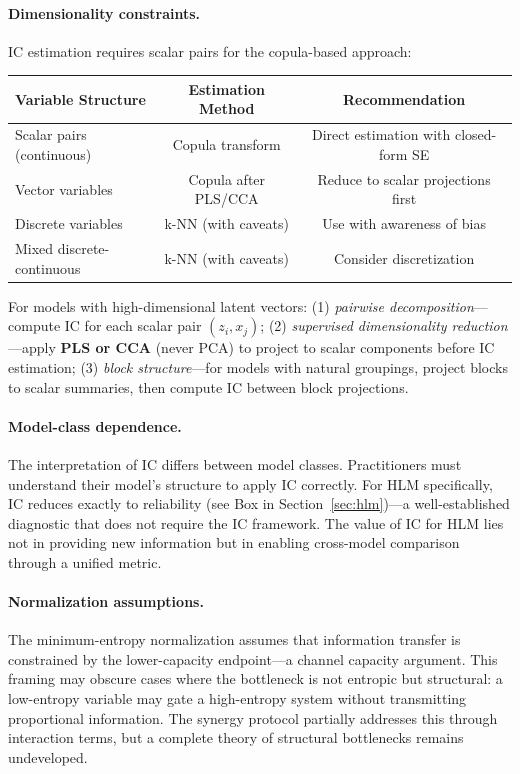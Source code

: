 \documentclass[10pt]{article} %
\theoremstyle{plain}
\theoremstyle{definition}
\begin{document}
\paragraph{Dimensionality constraints.} IC estimation requires scalar pairs for the copula-based approach:

\begin{center}
\begin{tabular}{lcc}
\toprule
Variable Structure & Estimation Method & Recommendation \\
\midrule
Scalar pairs (continuous) & Copula transform & Direct estimation with closed-form SE \\
Vector variables & Copula after PLS/CCA & Reduce to scalar projections first \\
Discrete variables & k-NN (with caveats) & Use with awareness of bias \\
Mixed discrete-continuous & k-NN (with caveats) & Consider discretization \\
\bottomrule
\end{tabular}
\end{center}

\noindent For models with high-dimensional latent vectors: (1) \emph{pairwise decomposition}---compute IC for each scalar pair $(z_i, x_j)$; (2) \emph{supervised dimensionality reduction}---apply \textbf{PLS or CCA} (never PCA) to project to scalar components before IC estimation; (3) \emph{block structure}---for models with natural groupings, project blocks to scalar summaries, then compute IC between block projections.

\paragraph{Model-class dependence.} The interpretation of IC differs between model classes. Practitioners must understand their model's structure to apply IC correctly. For HLM specifically, IC reduces exactly to reliability (see Box in Section~\ref{sec:hlm})---a well-established diagnostic that does not require the IC framework. The value of IC for HLM lies not in providing new information but in enabling cross-model comparison through a unified metric.

\paragraph{Normalization assumptions.} The minimum-entropy normalization assumes that information transfer is constrained by the lower-capacity endpoint---a channel capacity argument. This framing may obscure cases where the bottleneck is not entropic but structural: a low-entropy variable may gate a high-entropy system without transmitting proportional information. The synergy protocol partially addresses this through interaction terms, but a complete theory of structural bottlenecks remains undeveloped.
\end{document}
